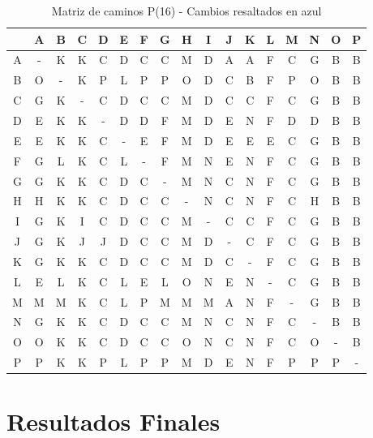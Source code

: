 \documentclass[12pt]{article}
\begin{document}
\begin{table}[h!]
\centering
\begin{tabular}{|c|c|c|c|c|c|c|c|c|c|c|c|c|c|c|c|c|}
\hline
 & A & B & C & D & E & F & G & H & I & J & K & L & M & N & O & P \\\hline
A & - & K & K & C & D & C & C & M & D & A & A & F & C & G & B & B \\\hline
B & O & - & K & \cellcolor{lightblue} P & \cellcolor{lightblue} L & \cellcolor{lightblue} P & \cellcolor{lightblue} P & O & \cellcolor{lightblue} D & C & B & F & \cellcolor{lightblue} P & O & B & B \\\hline
C & G & K & - & C & D & C & C & M & D & C & C & F & C & G & B & B \\\hline
D & E & K & K & - & D & D & F & M & D & E & N & F & D & D & B & B \\\hline
E & E & K & K & C & - & E & F & M & D & E & E & E & C & G & B & B \\\hline
F & G & L & K & C & L & - & F & M & N & E & N & F & C & G & B & B \\\hline
G & G & K & K & C & D & C & - & M & N & C & N & F & C & G & B & B \\\hline
H & H & K & K & C & D & C & C & - & N & C & N & F & C & H & B & B \\\hline
I & G & K & I & C & D & C & C & M & - & C & C & F & C & G & B & B \\\hline
J & G & K & J & J & D & C & C & M & D & - & C & F & C & G & B & B \\\hline
K & G & K & K & C & D & C & C & M & D & C & - & F & C & G & B & B \\\hline
L & E & L & K & C & L & E & L & O & N & E & N & - & C & G & B & B \\\hline
M & M & M & K & C & \cellcolor{lightblue} L & \cellcolor{lightblue} P & M & M & M & A & N & F & - & G & B & B \\\hline
N & G & K & K & C & D & C & C & M & N & C & N & F & C & - & B & B \\\hline
O & O & K & K & C & D & C & C & O & N & C & N & F & C & O & - & B \\\hline
P & P & K & K & P & L & P & P & M & D & E & N & F & P & P & P & - \\\hline
\end{tabular}
\caption{Matriz de caminos P(16) - Cambios resaltados en azul}
\end{table}

\clearpage
\section{Resultados Finales}
\end{document}
